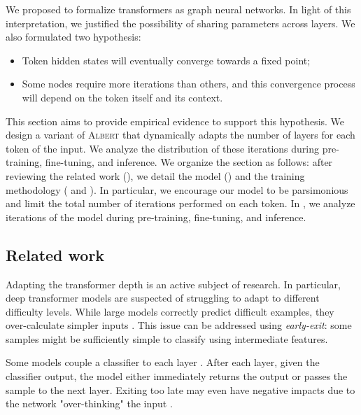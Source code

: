 We proposed to formalize transformers as graph neural networks. In light of this interpretation, we justified the possibility of sharing parameters across layers. We also formulated two hypothesis: 
\begin{itemize}
    \item Token hidden states will eventually converge towards a fixed point;
    \item Some nodes require more iterations than others, and this convergence process will depend on the token itself and its context.
\end{itemize}
This section aims to provide empirical evidence to support this hypothesis. We design a variant of \textsc{Albert} that dynamically adapts the number of layers for each token of the input. We analyze the distribution of these iterations during pre-training, fine-tuning, and inference. We organize the section as follows: after reviewing the related work (), we detail the model () and the training methodology ( and ). In particular, we encourage our model to be parsimonious and limit the total number of iterations performed on each token. In , we analyze iterations of the model during pre-training, fine-tuning, and inference.

\subsection{Related work}

Adapting the transformer depth is an active subject of research. In particular, deep transformer models are suspected of struggling to adapt to different difficulty levels. While large models correctly predict difficult examples, they over-calculate simpler inputs \parencite{liu_20}. This issue can be addressed using \textit{early-exit}: some samples might be sufficiently simple to classify using intermediate features. %

Some models couple a classifier to each layer \parencite{zhou_20b, liu_20, xin_20}. After each layer, given the classifier output, the model either immediately returns the output or passes the sample to the next layer. 
Exiting too late may even have negative impacts due to the network "over-thinking" the input \parencite{kaya_19}. 

